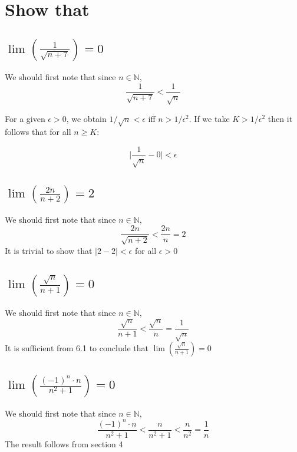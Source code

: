 \documentclass{article}
\begin{document}
\section{Show that}
\subsection{$\lim(\frac{1}{\sqrt{n + 7}}) = 0$}

We should first note that since $n \in \mathbb{N}$,
\begin{equation*}
    \frac{1}{\sqrt{n + 7}} < \frac{1}{\sqrt{n}}
\end{equation*}

For a given $\epsilon > 0$, we obtain $1/\sqrt{n} < \epsilon$ iff $n > 1/\epsilon^2$. 
If we take $K > 1/\epsilon^2$ then it follows that for all $n \ge K$:

\begin{equation*}
    \Big|\frac{1}{\sqrt{n}} - 0 \Big| < \epsilon
\end{equation*}

\subsection{$\lim(\frac{2n}{n + 2}) = 2$}
We should first note that since $n \in \mathbb{N}$,
\begin{equation*}
    \frac{2n}{\sqrt{n + 2}} < \frac{2n}{n} = 2
\end{equation*}
It is trivial to show that $|2 - 2| < \epsilon$ for all $\epsilon > 0$


\subsection{$\lim(\frac{\sqrt{n}}{n + 1}) = 0$}
We should first note that since $n \in \mathbb{N}$,
\begin{equation*}
    \frac{\sqrt{n}}{n + 1} < \frac{\sqrt{n}}{n} = \frac{1}{\sqrt{n}}
\end{equation*}
It is sufficient from 6.1 to conclude that $\lim(\frac{\sqrt{n}}{n + 1}) = 0$

\subsection{$\lim(\frac{(-1)^n \cdot n}{n^2 + 1}) = 0$}
We should first note that since $n \in \mathbb{N}$,
\begin{equation*}
    \frac{(-1)^n \cdot n}{n^2 + 1} < \frac{n}{n^2 + 1} < \frac{n}{n^2} = \frac{1}{n}
\end{equation*}
The result follows from section 4
\end{document}
